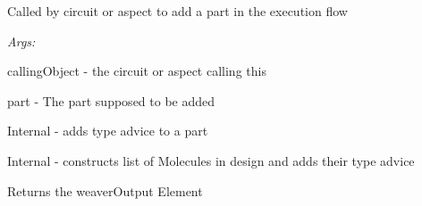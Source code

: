 \documentclass[letterpaper,10pt,english]{sphinxmanual}
\begin{document}
\begin{fulllineitems}
\begin{fulllineitems}
\end{fulllineitems}


\begin{fulllineitems}
\label{modules/index:aosb.core.Weaver.addPart}
Called by circuit or aspect to add a part in the execution flow

\begin{DUlineblock}{0em}
\item[] \emph{Args:}
\item[]
\begin{DUlineblock}{\DUlineblockindent}
\item[] callingObject - the circuit or aspect calling this
\item[] part - The part supposed to be added
\end{DUlineblock}
\end{DUlineblock}

\end{fulllineitems}


\begin{fulllineitems}
\label{modules/index:aosb.core.Weaver.addPartTypeAdvice}
Internal - adds type advice to a part

\end{fulllineitems}


\begin{fulllineitems}
\label{modules/index:aosb.core.Weaver.constructMoleculeListAndAddTypeAdvice}
Internal - constructs list of Molecules in design and adds their type advice

\end{fulllineitems}


\begin{fulllineitems}
\label{modules/index:aosb.core.Weaver.output}
Returns the weaverOutput Element


\end{fulllineitems}
\end{fulllineitems}
\end{document}
